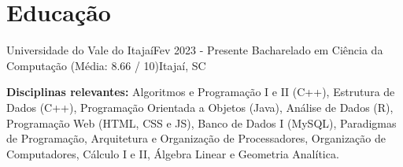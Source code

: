 \section{Educação}
    \resumeSubHeadingListStart

    \resumeSubheading
    {Universidade do Vale do Itajaí}{Fev 2023 - Presente}
    {Bacharelado em Ciência da Computação (Média: 8.66 / 10)}{Itajaí, SC}

    \hfill
        
    {\textbf{Disciplinas relevantes:}  Algoritmos e Programação I e II (C++), Estrutura de Dados (C++), Programação Orientada a Objetos (Java), Análise de Dados (R), Programação Web (HTML, CSS e JS), Banco de Dados I (MySQL), Paradigmas de Programação, Arquitetura e Organização de Processadores, Organização de Computadores, Cálculo I e II, Álgebra Linear e Geometria Analítica.}


    \resumeSubHeadingListEnd